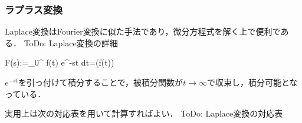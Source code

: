 \subsubsection{ラプラス変換}

Laplace変換はFourier変換に似た手法であり，微分方程式を解く上で便利である．
ToDo: Laplace変換の詳細


F(s):=\int_0^{\infty} f(t) e^{-st} dt=(f(t))


$e^{-st}$を引っ付けて積分することで，被積分関数が$t\to \infty$で収束し，積分可能となっている．

実用上は次の対応表を用いて計算すればよい．
ToDo: Laplace変換の対応表
